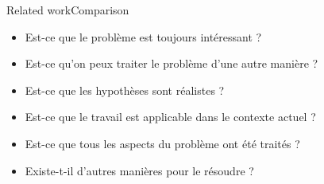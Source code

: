 \begin{frame}{Related work}{Comparison}
{\begin{itemize}
			\begin{itemize}
				\item Est-ce que le problème est toujours intéressant ?
				\item Est-ce qu'on peux traiter le problème d'une autre manière ?
				\item Est-ce que les hypothèses sont réalistes ?
				\item Est-ce que le travail est applicable dans le contexte actuel ?
				\item Est-ce que tous les aspects du problème ont été traités ?
				\item Existe-t-il d’autres manières pour le résoudre ?
			\end{itemize}
		\end{itemize}
	}
\end{frame}


